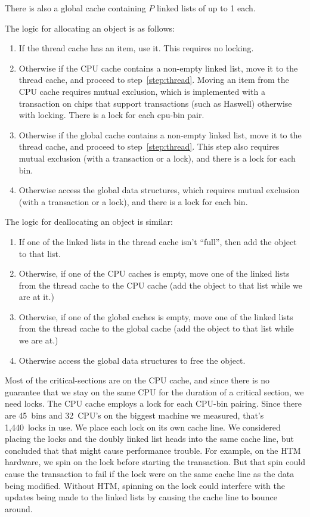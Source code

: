 \documentclass{sigplanconf}
\begin{document}
There is also a global cache containing $P$ linked lists of up to
\unit{1}\mebi\byte{} each. 

The logic for allocating an object is as follows:
\begin{enumerate}
\item If the thread cache has an item, use it.  This requires no
  locking. \label{step:thread}
\item Otherwise if the CPU cache contains a non-empty linked list,
  move it to the thread cache, and proceed to step~\ref{step:thread}.
  Moving an item from the CPU cache requires mutual exclusion, which
  is implemented with a transaction on chips that support transactions
  (such as Haswell) otherwise with locking. There is a lock for each
  cpu-bin pair.\label{step:cpu}
\item Otherwise if the global cache contains a non-empty linked list,
  move it to the thread cache, and proceed to step~\ref{step:thread}.
  This step also requires mutual exclusion (with a transaction or a
  lock), and there is a lock for each bin.
\item Otherwise access the global data structures, which requires
  mutual exclusion (with a transaction or a lock), and there is a lock
  for each bin.
\end{enumerate}

The logic for deallocating an object is similar:
\begin{enumerate}
\item If one of the linked lists in the thread cache isn't ``full'',
  then add the object to that list.
\item Otherwise, if one of the CPU caches is empty, move one of the
  linked lists from the thread cache to the CPU cache (add the object
  to that list while we are at it.)
\item Otherwise, if one of the global caches is empty, move one of the
  linked lists from the thread cache to the global cache (add the
  object to that list while we are at.)
\item Otherwise access the global data structures to free the object.
\end{enumerate}

Most of the critical-sections are on the CPU cache, and since there is
no guarantee that we stay on the same CPU for the duration of a
critical section, we need locks.  The CPU cache employs a lock for
each CPU-bin pairing.  Since there are 45~bins and 32~CPU's on the
biggest machine we measured, that's 1,440~locks in use.  We place each
lock on its own cache line.  We considered placing the locks and the
doubly linked list heads into the same cache line, but concluded that
that might cause performance trouble.  For example, on the HTM
hardware, we spin on the lock before starting the transaction.  But
that spin could cause the transaction to fail if the lock were on the
same cache line as the data being modified.  Without HTM, spinning on
the lock could interfere with the updates being made to the linked
lists by causing the cache line to bounce around.
\end{document}

